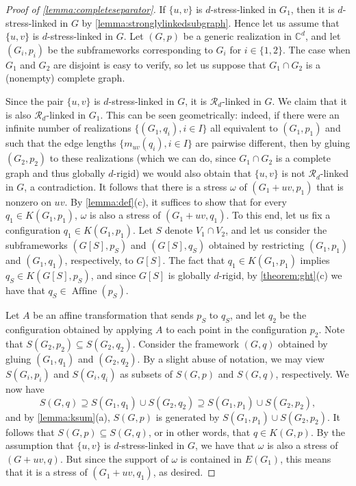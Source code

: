 \documentclass[11pt,a4paper,dvipsnames]{scrartcl}
\theoremstyle{definition}
\newcommand{\CC}{\mathbb{C}}
\newcommand{\globrig}[1]{globally $#1$-rigid}
\newcommand{\strongly}[1]{${#1}$-stress-linked}
\newcommand{\sharedstresskernel}[1]{K}
\DeclareMathOperator{\aff}{Affine}
\newcommand{\affine}[2]{\aff(#2)}
\begin{document}
\begin{proof}[Proof of \cref{lemma:completeseparator}]
    If $\{u,v\}$ is \strongly{d} in $G_1$, then it is \strongly{d} in $G$ by \cref{lemma:stronglylinkedsubgraph}. Hence let us assume that $\{u,v\}$ is \strongly{d} in $G$. Let $(G,p)$ be a generic realization in $\CC^d$, and let $(G_i,p_i)$ be the subframeworks corresponding to $G_i$ for $i \in \{1,2\}$. The case when $G_1$ and $G_2$ are disjoint is easy to verify, so let us suppose that $G_1 \cap G_2$ is a (nonempty) complete graph.
    
    Since the pair $\{u,v\}$ is \strongly{d} in $G$, it is $\mathcal{R}_d$-linked in $G$. We claim that it is also $\mathcal{R}_d$-linked in $G_1$. This can be seen geometrically: indeed, if there were an infinite number of realizations $\{(G_1,q_i), i \in I\}$ all equivalent to $(G_1,p_1)$ and such that the edge lengths $\{m_{uv}(q_i), i \in I\}$ are pairwise different, then by gluing $(G_2,p_2)$ to these realizations (which we can do, since $G_1 \cap G_2$ is a complete graph and thus \globrig{d}) we would also obtain that $\{u,v\}$ is not $\mathcal{R}_d$-linked in $G$, a contradiction. It follows that there is a stress $\omega$ of $(G_1+uv,p_1)$ that is nonzero on $uv$. By \cref{lemma:def}(c), it suffices to show that for every $q_1 \in \sharedstresskernel{d}(G_1,p_1)$, $\omega$ is also a stress of $(G_1+uv,q_1)$. To this end, let us fix a configuration $q_1 \in \sharedstresskernel{d}(G_1,p_1)$. Let $S$ denote $V_1 \cap V_2$, and let us consider the subframeworks $(G[S],p_S)$ and $(G[S],q_S)$ obtained by restricting $(G_1,p_1)$ and $(G_1,q_1)$, respectively, to $G[S]$. The fact that $q_1 \in \sharedstresskernel{d}(G_1,p_1)$ implies $q_S \in \sharedstresskernel{d}(G[S],p_S)$, and since $G[S]$ is \globrig{d}, by \cref{theorem:ght}(c) we have that $q_S \in \affine{G[S]}{p_S}$. 
    
    Let $A$ be an affine transformation that sends $p_S$ to $q_S$, and let $q_2$ be the configuration obtained by applying $A$ to each point in the configuration $p_2$. Note that $S(G_2,p_2) \subseteq S(G_2,q_2)$. Consider the framework $(G,q)$ obtained by gluing $(G_1,q_1)$ and $(G_2,q_2)$. By a slight abuse of notation, we may view $S(G_i,p_i)$ and $S(G_i,q_i)$ as subsets of $S(G,p)$ and $S(G,q)$, respectively. We now have \[S(G,q) \supseteq S(G_1,q_1) \cup S(G_2,q_2) \supseteq S(G_1,p_1) \cup S(G_2,p_2),\] and by \cref{lemma:ksum}(a), $S(G,p)$ is generated by $S(G_1,p_1) \cup S(G_2,p_2)$. It follows that $S(G,p) \subseteq S(G,q)$, or in other words, that $q \in \sharedstresskernel{d}(G,p)$. By the assumption that $\{u,v\}$ is \strongly{d} in $G$, we have that $\omega$ is also a stress of $(G+uv,q)$. But since the support of $\omega$ is contained in $E(G_1)$, this means that it is a stress of $(G_1+uv,q_1)$, as desired.
\end{proof}
\end{document}
